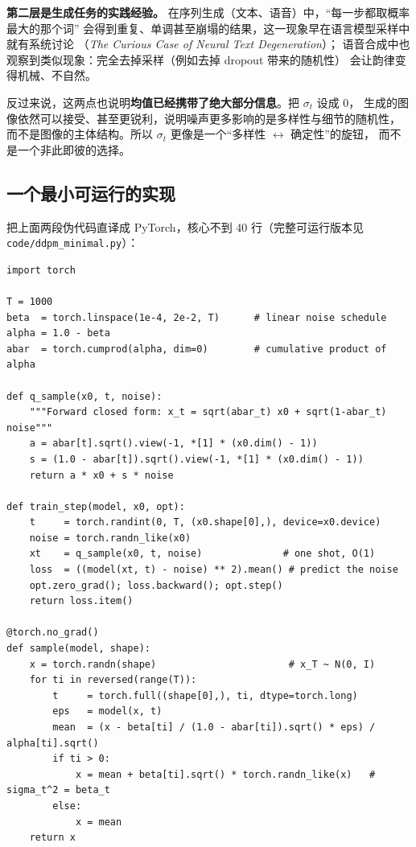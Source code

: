 \textbf{第二层是生成任务的实践经验。} 在序列生成（文本、语音）中，“每一步都取概率最大的那个词”
会得到重复、单调甚至崩塌的结果，这一现象早在语言模型采样中就有系统讨论
（\emph{The Curious Case of Neural Text Degeneration}\cite{holtzman2020curious}）；
语音合成中也观察到类似现象：完全去掉采样（例如去掉 dropout 带来的随机性）
会让韵律变得机械、不自然\cite{lee-ddpm}。

反过来说，这两点也说明\textbf{均值已经携带了绝大部分信息}。把 $\sigma_t$ 设成 $0$，
生成的图像依然可以接受、甚至更锐利，说明噪声更多影响的是多样性与细节的随机性，
而不是图像的主体结构。所以 $\sigma_t$ 更像是一个“多样性 $\leftrightarrow$ 确定性”的旋钮，
而不是一个非此即彼的选择。

\subsection{一个最小可运行的实现}

把上面两段伪代码直译成 PyTorch，核心不到 40 行（完整可运行版本见 \texttt{code/ddpm\_minimal.py}）：

\begin{lstlisting}[caption={DDPM 的最小实现（训练与采样）}, label={lst:ddpm}]
import torch

T = 1000
beta  = torch.linspace(1e-4, 2e-2, T)      # linear noise schedule
alpha = 1.0 - beta
abar  = torch.cumprod(alpha, dim=0)        # cumulative product of alpha

def q_sample(x0, t, noise):
    """Forward closed form: x_t = sqrt(abar_t) x0 + sqrt(1-abar_t) noise"""
    a = abar[t].sqrt().view(-1, *[1] * (x0.dim() - 1))
    s = (1.0 - abar[t]).sqrt().view(-1, *[1] * (x0.dim() - 1))
    return a * x0 + s * noise

def train_step(model, x0, opt):
    t     = torch.randint(0, T, (x0.shape[0],), device=x0.device)
    noise = torch.randn_like(x0)
    xt    = q_sample(x0, t, noise)              # one shot, O(1)
    loss  = ((model(xt, t) - noise) ** 2).mean() # predict the noise
    opt.zero_grad(); loss.backward(); opt.step()
    return loss.item()

@torch.no_grad()
def sample(model, shape):
    x = torch.randn(shape)                       # x_T ~ N(0, I)
    for ti in reversed(range(T)):
        t     = torch.full((shape[0],), ti, dtype=torch.long)
        eps   = model(x, t)
        mean  = (x - beta[ti] / (1.0 - abar[ti]).sqrt() * eps) / alpha[ti].sqrt()
        if ti > 0:
            x = mean + beta[ti].sqrt() * torch.randn_like(x)   # sigma_t^2 = beta_t
        else:
            x = mean
    return x
\end{lstlisting}
